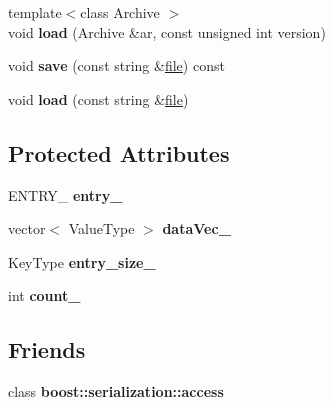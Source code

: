 \begin{CompactItemize}
\item 
\hypertarget{classMap_3f57005e15bc10aaf61d42097c950d91}{
{\footnotesize template$<$class Archive $>$ }\\void \textbf{load} (Archive \&ar, const unsigned int version)}
\label{classMap_3f57005e15bc10aaf61d42097c950d91}

\item 
\hypertarget{classMap_9093e5050c37e510c44ad9c8560617ad}{
void \textbf{save} (const string \&\hyperlink{classfile}{file}) const }
\label{classMap_9093e5050c37e510c44ad9c8560617ad}

\item 
\hypertarget{classMap_23c4353d14b9796736666a9d32957bf2}{
void \textbf{load} (const string \&\hyperlink{classfile}{file})}
\label{classMap_23c4353d14b9796736666a9d32957bf2}

\end{CompactItemize}
\subsection*{Protected Attributes}
\begin{CompactItemize}
\item 
\hypertarget{classMap_aef62b0c834655cb9e086bea2c6f1285}{
ENTRY\_\- \textbf{entry\_\-}}
\label{classMap_aef62b0c834655cb9e086bea2c6f1285}

\item 
\hypertarget{classMap_976274497aa599402a61d4f4d062ca77}{
vector$<$ ValueType $>$ \textbf{dataVec\_\-}}
\label{classMap_976274497aa599402a61d4f4d062ca77}

\item 
\hypertarget{classMap_3bfdca718cd015a3e8ad1970e8e81cde}{
KeyType \textbf{entry\_\-size\_\-}}
\label{classMap_3bfdca718cd015a3e8ad1970e8e81cde}

\item 
\hypertarget{classMap_678a5c672b55c44e84db946081e70664}{
int \textbf{count\_\-}}
\label{classMap_678a5c672b55c44e84db946081e70664}

\end{CompactItemize}
\subsection*{Friends}
\begin{CompactItemize}
\item 
\hypertarget{classMap_c98d07dd8f7b70e16ccb9a01abf56b9c}{
class \textbf{boost::serialization::access}}
\label{classMap_c98d07dd8f7b70e16ccb9a01abf56b9c}

\end{CompactItemize}



